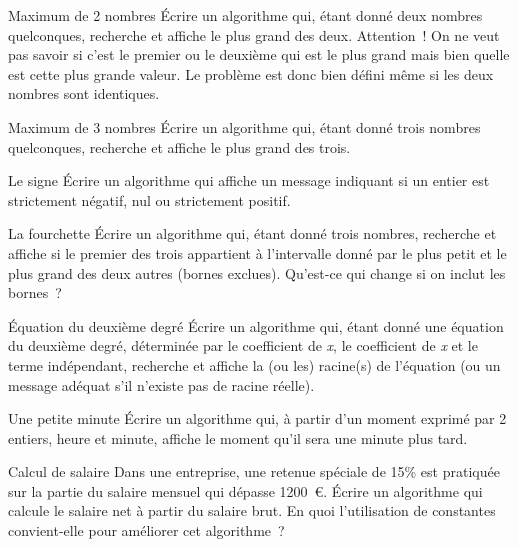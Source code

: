 \begin{Exercice}{Maximum de 2 nombres}
	Écrire un algorithme qui, étant donné deux nombres quelconques,
	recherche et affiche le plus grand des deux. Attention~! On ne veut
	pas savoir si c’est le premier ou le deuxième qui est
	le plus grand mais bien quelle est cette plus grande valeur. Le
	problème est donc bien défini même si les deux nombres sont
	identiques.
\end{Exercice}

\begin{Exercice}{Maximum de 3 nombres}
	Écrire un algorithme qui, étant donné trois nombres quelconques,
	recherche et affiche le plus grand des trois.
\end{Exercice}

\begin{Exercice}{Le signe}
	Écrire un algorithme qui affiche un message indiquant
	si un entier est strictement négatif, nul ou strictement
	positif.
\end{Exercice}

\begin{Exercice}{La fourchette}
	Écrire un algorithme qui, étant donné trois nombres, 
	recherche et affiche si le premier des trois 
	appartient à l’intervalle donné par le plus petit et le plus grand 
	des deux autres (bornes exclues). 
	Qu’est-ce qui change si on inclut les bornes~?
\end{Exercice}

\begin{Exercice}{Équation du deuxième degré}
	Écrire un algorithme qui, 
	étant donné une équation du deuxième degré, 
	déterminée par le coefficient de \textit{x},
	le coefficient de \textit{x} et le terme indépendant, 
	recherche et affiche la (ou les) racine(s) de l’équation 
	(ou un message adéquat s’il n’existe pas de racine réelle).
\end{Exercice}

\begin{Exercice}{Une petite minute}
	Écrire un algorithme qui, à partir d’un moment exprimé par 2 entiers, 
	heure et minute, affiche le moment qu’il sera une minute plus tard.
\end{Exercice}

\begin{Exercice}{Calcul de salaire}
	Dans une entreprise, 
	une retenue spéciale de 15\% est pratiquée 
	sur la partie du salaire mensuel qui dépasse 1200~\euro. 
	Écrire un algorithme qui calcule le salaire net à partir du salaire brut. 
	En quoi l’utilisation de constantes convient-elle pour améliorer cet algorithme~?
\end{Exercice}

